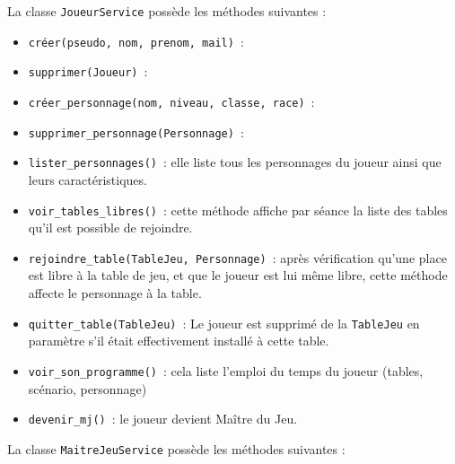 \documentclass[11pt]{article}
\begin{document}
La classe \texttt{JoueurService} possède les méthodes suivantes :
\begin{itemize}[label=, font=\small]
    \item \texttt{créer(pseudo, nom, prenom, mail)}~: 
    \item \texttt{supprimer(Joueur)}~: 
    \item \texttt{créer\_personnage(nom, niveau, classe, race)}~: 
    \item \texttt{supprimer\_personnage(Personnage)}~: 
    \item \texttt{lister\_personnages()}~: elle liste tous les personnages du joueur ainsi que leurs caractéristiques.
    \item \texttt{voir\_tables\_libres()}~: cette méthode affiche par séance la liste des tables qu'il est possible de rejoindre.
    \item \texttt{rejoindre\_table(TableJeu, Personnage)}~: après vérification qu'une place est libre à la table de jeu, et que le joueur est lui même libre, cette méthode affecte le personnage à la table.
    \item \texttt{quitter\_table(TableJeu)}~: Le joueur est supprimé de la \texttt{TableJeu} en paramètre s'il était effectivement installé à cette table.
    \item \texttt{voir\_son\_programme()}~: cela liste l'emploi du temps du joueur (tables, scénario, personnage)
    \item \texttt{devenir\_mj()}~: le joueur devient Maître du Jeu.
\end{itemize}


\bigbreak


La classe \texttt{MaitreJeuService} possède les méthodes suivantes :
\end{document}
